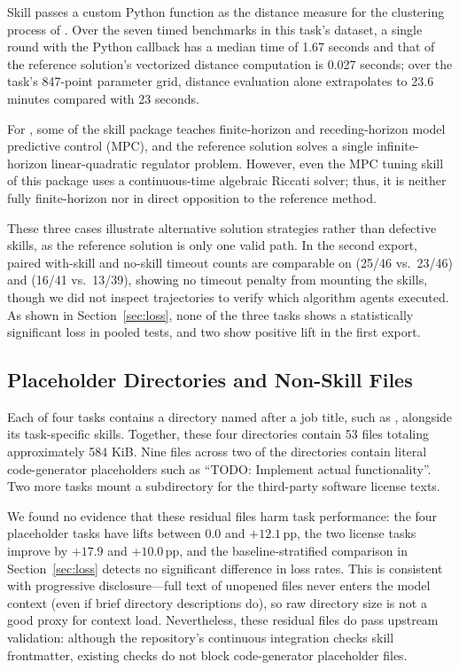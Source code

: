 \documentclass[10pt,conference]{IEEEtran}
\newif\ifkeepcuts \keepcutsfalse
\newcommand{\cut}[1]{\ifkeepcuts #1\fi}
\begin{document}
Skill passes a custom Python function as the distance measure for the clustering process of . Over the seven timed benchmarks in this task's dataset, a single round with the Python callback has a median time of 1.67 seconds and that of the reference solution's vectorized distance computation is 0.027 seconds; over the task's 847-point parameter grid, distance evaluation alone extrapolates to 23.6 minutes compared with 23 seconds.

For , some of the skill package teaches finite-horizon and receding-horizon model predictive control (MPC), and the reference solution solves a single infinite-horizon linear-quadratic regulator problem. However, even the MPC tuning skill of this package uses a continuous-time algebraic Riccati solver; thus, it is neither fully finite-horizon nor in direct opposition to the reference method.

These three cases illustrate alternative solution strategies rather than defective skills, as the reference solution is only one valid path. In the second export, paired with-skill and no-skill timeout counts are comparable on  (25/46 vs.\ 23/46) and  (16/41 vs.\ 13/39), showing no timeout penalty from mounting the skills, though we did not inspect trajectories to verify which algorithm agents executed. As shown in Section~\ref{sec:loss}, none of the three tasks shows a statistically significant loss in pooled tests, and two show positive lift in the first export.\cut{ We retain them as concrete hypotheses for future trajectory-level analysis, consistent with qualitative failure modes noted in SkillsBench~\cite{li2026skillsbench}.}

\subsection{Placeholder Directories and Non-Skill Files}
Each of four tasks contains a directory named after a job title, such as , alongside its task-specific skills. Together, these four directories contain 53 files totaling approximately 584 KiB. Nine files across two of the directories contain literal code-generator placeholders such as ``TODO: Implement actual functionality''. Two more tasks mount a  subdirectory for the third-party software license texts.

We found no evidence that these residual files harm task performance: the four placeholder tasks have lifts between $0.0$ and $+12.1$\,pp, the two license tasks improve by $+17.9$ and $+10.0$\,pp, and the baseline-stratified comparison in Section~\ref{sec:loss} detects no significant difference in loss rates. This is consistent with progressive disclosure---full text of unopened files never enters the model context (even if brief directory descriptions do), so raw directory size is not a good proxy for context load. Nevertheless, these residual files do pass upstream validation: although the repository's continuous integration checks skill frontmatter, existing checks do not block code-generator placeholder files.
\end{document}
